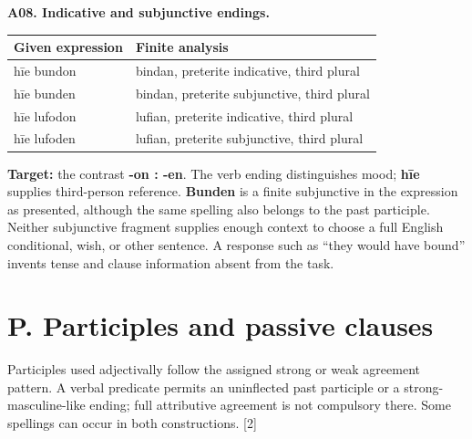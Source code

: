 \par\begin{minipage}{\linewidth}\raggedright
\textbf{A08. Indicative and subjunctive endings.}

\par\begingroup
\fontsize{10.5}{13.2}\selectfont
\setlength{\LTleft}{0pt}\setlength{\LTright}{\fill}
\noindent
\begin{tabular}{@{}>{\raggedright\arraybackslash}p{39.82mm}>{\raggedright\arraybackslash}p{81.37mm}@{}}
\toprule
\textbf{Given expression} & \textbf{Finite analysis} \\
\midrule
hīe bundon & bindan, preterite indicative, third plural \\
hīe bunden & bindan, preterite subjunctive, third plural \\
hīe lufodon & lufian, preterite indicative, third plural \\
hīe lufoden & lufian, preterite subjunctive, third plural \\
\bottomrule
\end{tabular}
\par\endgroup

\textbf{Target:} the contrast \textbf{-on : -en}. The verb ending distinguishes mood; \textbf{hīe} supplies third-person reference. \textbf{Bunden} is a finite subjunctive in the expression as presented, although the same spelling also belongs to the past participle. Neither subjunctive fragment supplies enough context to choose a full English conditional, wish, or other sentence. A response such as “they would have bound” invents tense and clause information absent from the task.

\end{minipage}\par\addvspace{4pt}

\section*{P. Participles and passive clauses}

Participles used adjectivally follow the assigned strong or weak agreement pattern. A verbal predicate permits an uninflected past participle or a strong-masculine-like ending; full attributive agreement is not compulsory there. Some spellings can occur in both constructions. [2]

